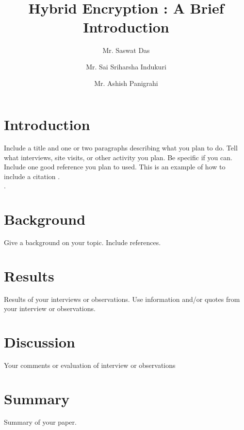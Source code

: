 \documentclass[journal]{IEEEtran}
\begin{document}
\title{Hybrid Encryption : A Brief Introduction}

\author[1]{Mr. Saswat Das}%
\author[2]{Mr. Sai Sriharsha Indukuri}\author[3]{Mr. Ashish Panigrahi}%

\maketitle


\section{Introduction }
Include a title and one or two paragraphs describing what you plan to do. Tell what interviews, site visits, or other activity you plan. Be specific if you can. Include  one good reference you plan to used. This is an example of how to include a citation \cite{williams1989style}.  \\.

\section {Background}
Give a background on your topic. Include references. 

\section{Results}
Results of your interviews or observations. Use information and/or quotes from your interview or observations.

\section{Discussion}
Your comments or evaluation of interview or observations

\section{Summary}
Summary of your paper.
\end{document}
